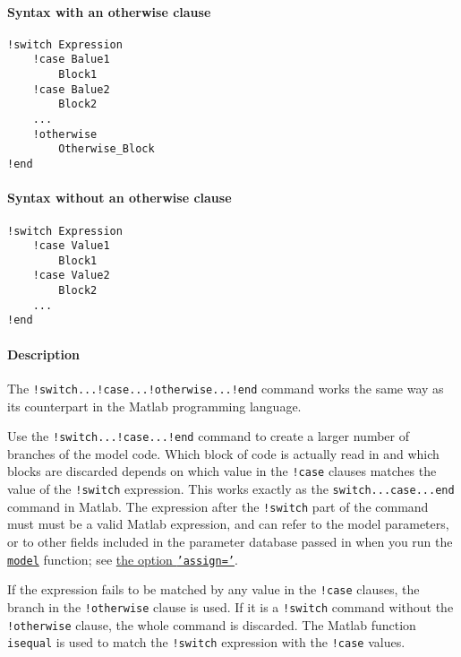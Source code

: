 


	\paragraph{Syntax with an otherwise
clause}\label{syntax-with-an-otherwise-clause}

\begin{verbatim}
!switch Expression
    !case Balue1
        Block1
    !case Balue2
        Block2
    ...
    !otherwise
        Otherwise_Block
!end
\end{verbatim}

\paragraph{Syntax without an otherwise
clause}\label{syntax-without-an-otherwise-clause}

\begin{verbatim}
!switch Expression
    !case Value1
        Block1
    !case Value2
        Block2
    ...
!end
\end{verbatim}

\paragraph{Description}\label{description}

The \texttt{!switch...!case...!otherwise...!end} command works the same
way as its counterpart in the Matlab programming language.

Use the \texttt{!switch...!case...!end} command to create a larger
number of branches of the model code. Which block of code is actually
read in and which blocks are discarded depends on which value in the
\texttt{!case} clauses matches the value of the \texttt{!switch}
expression. This works exactly as the \texttt{switch...case...end}
command in Matlab. The expression after the \texttt{!switch} part of the
command must must be a valid Matlab expression, and can refer to the
model parameters, or to other fields included in the parameter database
passed in when you run the \href{model/model}{\texttt{model}} function;
see \href{model/model}{the option \texttt{'assign='}}.

If the expression fails to be matched by any value in the \texttt{!case}
clauses, the branch in the \texttt{!otherwise} clause is used. If it is
a \texttt{!switch} command without the \texttt{!otherwise} clause, the
whole command is discarded. The Matlab function \texttt{isequal} is used
to match the \texttt{!switch} expression with the \texttt{!case} values.

